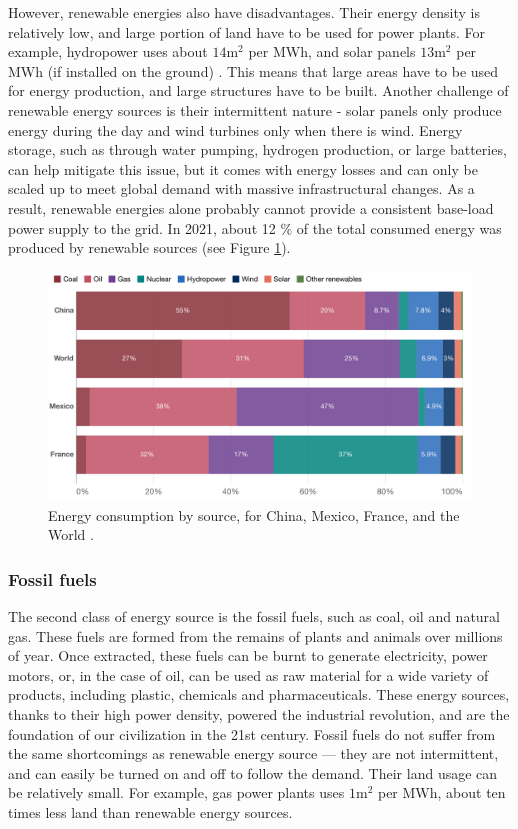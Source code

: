 \documentclass[my_thesis.tex]{subfiles}
\begin{document}
However, renewable energies also have disadvantages. Their energy density is relatively low, and large portion of land have to be used for power plants. For example, hydropower uses about $14\text{m}^2$ per MWh, and solar panels $13\text{m}^2$ per MWh (if installed on the ground) \citep{ritchieHowDoesLand2022}. This means that large areas have to be used for energy production, and large structures have to be built. Another challenge of renewable energy sources is their intermittent nature - solar panels only produce energy during the day and wind turbines only when there is wind. Energy storage, such as through water pumping, hydrogen production, or large batteries, can help mitigate this issue, but it comes with energy losses and can only be scaled up to meet global demand with massive infrastructural changes. As a result, renewable energies alone probably cannot provide a consistent base-load power supply to the grid. In 2021, about 12 \% of the total consumed energy was produced by renewable sources (see Figure \ref{fig.energy consumption}).

\begin{figure}
    \centering
    \includegraphics[width=\linewidth]{images/primary-energy-source-bar.png}
    \caption{Energy consumption by source, for China, Mexico, France, and the World \citep{ritchieWhichSourcesDoes2021}.}
    \label{fig.energy consumption}
\end{figure}

\subsubsection{Fossil fuels}
The second class of energy source is the fossil fuels, such as coal, oil and natural gas. These fuels are formed from the remains of plants and animals over millions of year. Once extracted, these fuels can be burnt to generate electricity, power motors, or, in the case of oil, can be used as raw material for a wide variety of products, including plastic, chemicals and pharmaceuticals. These energy sources, thanks to their high power density, powered the industrial revolution, and are the foundation of our civilization in the 21st century. Fossil fuels do not suffer from the same shortcomings as renewable energy source --- they are not intermittent, and can easily be turned on and off to follow the demand. Their land usage can be relatively small. For example, gas power plants uses $1\text{m}^2$ per MWh, about ten times less land than renewable energy sources. 
\end{document}

